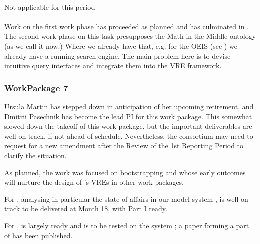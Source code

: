 \documentclass{deliverablereport}
\begin{document}
  \paragraph{}
  Not applicable for this period
  
  \paragraph{}
  Work on the first work phase has proceeded as planned and has culminated in
  . The second work phase on this task presupposes the
  Math-in-the-Middle ontology (as we call it now.) Where we already have that, e.g. for
  the OEIS (see ) we already have a running search
  engine. The main problem here is to devise intuitive query interfaces and integrate them
  into the \pn VRE framework.


  \subsubsection{WorkPackage 7}
  Ursula Martin has stepped down in anticipation of her upcoming retirement, and Dmitrii
  Pasechnik has become the lead PI for this work package.  This somewhat slowed down the
  takeoff of this work package, but the important deliverables are well on track, if not
  ahead of schedule. Nevertheless, the consortium may need to request for a new amendment
  after the Review of the 1st Reporting Period to clarify the situation.

  As planned, the work was focused on bootstrapping
   and
   whose early outcomes will nurture
  the design of \ODK's VREs in other work packages.

  For ,
   analysing in particular the state of
  affairs in our model system \Sage, is well on track to be delivered at Month 18, with
  Part I ready.

  For ,
   is largely ready and is to be tested on the
  system \Sage; a paper \cite{Pavlou:2016:MCI:2936924.2936934} forming a part of
   has been published.
\end{document}
